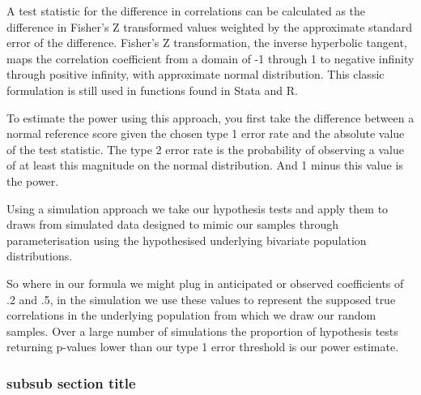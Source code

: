 A test statistic for the difference in correlations can be calculated as the difference in Fisher's Z transformed values weighted by the approximate standard error of the difference.  Fisher's Z transformation, the inverse hyperbolic tangent, maps the correlation coefficient from a domain of -1 through 1 to negative infinity through positive infinity, with approximate normal distribution.  This classic formulation is still used in functions found in Stata and R.

To estimate the power using this approach, you first take the difference between a normal reference score given the chosen type 1 error rate and the absolute value of the test statistic. The type 2 error rate is the probability of observing a value of at least this magnitude on the normal distribution.  And 1 minus this value is the power.

Using a simulation approach we take our hypothesis tests and apply them to draws from simulated data designed to mimic our samples through parameterisation using the hypothesised underlying bivariate population distributions.  

So where in our formula we might plug in anticipated or observed coefficients of .2 and .5, in the simulation we use these values to represent the supposed true correlations in the underlying population from which we draw our random samples.  Over a large number of simulations the proportion of hypothesis tests returning p-values lower than our type 1 error threshold is our power estimate.

 \subsubsection{subsub section title}
 

			
